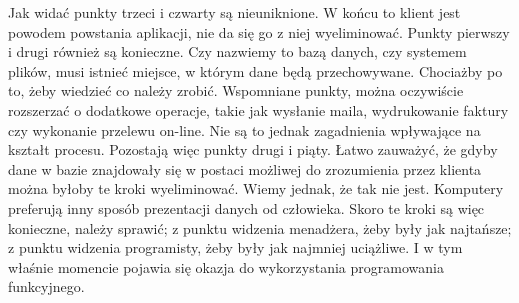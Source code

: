 \documentclass[a4paper,10pt]{report}
\begin{document}
Jak widać punkty trzeci i czwarty są nieuniknione. W końcu to klient jest powodem powstania aplikacji, nie da się go z niej wyeliminować. Punkty pierwszy i drugi również są konieczne. Czy nazwiemy to bazą danych, czy systemem plików, musi istnieć miejsce, w którym dane będą przechowywane. Chociażby po to, żeby wiedzieć co należy zrobić. Wspomniane punkty, można oczywiście rozszerzać o dodatkowe operacje, takie jak wysłanie maila, wydrukowanie faktury czy wykonanie przelewu on-line. Nie są to jednak zagadnienia wpływające na kształt procesu. Pozostają więc punkty drugi i piąty. Łatwo zauważyć, że gdyby dane w bazie znajdowały się w postaci możliwej do zrozumienia przez klienta można byłoby te kroki wyeliminować. Wiemy jednak, że tak nie jest. Komputery preferują inny sposób prezentacji danych od człowieka. Skoro te kroki są więc konieczne, należy sprawić; z punktu widzenia menadżera, żeby były jak najtańsze; z punktu widzenia programisty, żeby były jak najmniej uciążliwe. I w tym właśnie momencie pojawia się okazja do wykorzystania programowania funkcyjnego.
\end{document}
